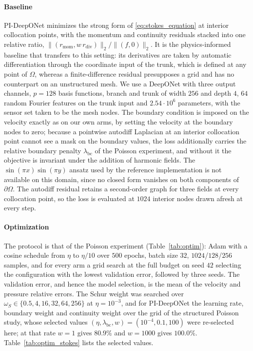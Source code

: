\documentclass{article} %
\begin{document}
\paragraph{Baseline} PI-DeepONet minimizes the strong form of \eqref{eq:stokes_equation} at interior collocation points, with the momentum and continuity residuals stacked into one relative ratio, $\|(r_{\mathrm{mom}}, w\, r_{\mathrm{div}})\|_2 / \|(f, 0)\|_2$. It is the physics-informed baseline that transfers to this setting: its derivatives are taken by automatic differentiation through the coordinate input of the trunk, which is defined at any point of $\Omega$, whereas a finite-difference residual presupposes a grid and has no counterpart on an unstructured mesh. We use a DeepONet with three output channels, $p = 128$ basis functions, branch and trunk of width $256$ and depth $4$, $64$ random Fourier features on the trunk input and $2.54\cdot 10^{6}$ parameters, with the sensor set taken to be the mesh nodes. The boundary condition is imposed on the velocity exactly as on our own arms, by setting the velocity at the boundary nodes to zero; because a pointwise autodiff Laplacian at an interior collocation point cannot see a mask on the boundary values, the loss additionally carries the relative boundary penalty $\lambda_{\mathrm{bc}}$ of the Poisson experiment, and without it the objective is invariant under the addition of harmonic fields. The $\sin(\pi x)\sin(\pi y)$ ansatz used by the reference implementation is not available on this domain, since no closed form vanishes on both components of $\partial\Omega$. The autodiff residual retains a second-order graph for three fields at every collocation point, so the loss is evaluated at $1024$ interior nodes drawn afresh at every step.

\paragraph{Optimization} The protocol is that of the Poisson experiment (Table~\ref{tab:optim}): Adam with a cosine schedule from $\eta$ to $\eta/10$ over $500$ epochs, batch size $32$, $1024$/$128$/$256$ samples, and for every arm a grid search at the full budget on seed $42$ selecting the configuration with the lowest validation error, followed by three seeds. The validation error, and hence the model selection, is the mean of the velocity and pressure relative errors. The Schur weight was searched over $\omega_S \in \{0.5, 4, 16, 32, 64, 256\}$ at $\eta = 10^{-3}$, and for PI-DeepONet the learning rate, boundary weight and continuity weight over the grid of the structured Poisson study, whose selected values $(\eta, \lambda_{\mathrm{bc}}, w) = (10^{-4}, 0.1, 100)$ were re-selected here; at that rate $w = 1$ gives $80.9\%$ and $w = 1000$ gives $100.0\%$. Table~\ref{tab:optim_stokes} lists the selected values.
\end{document}
